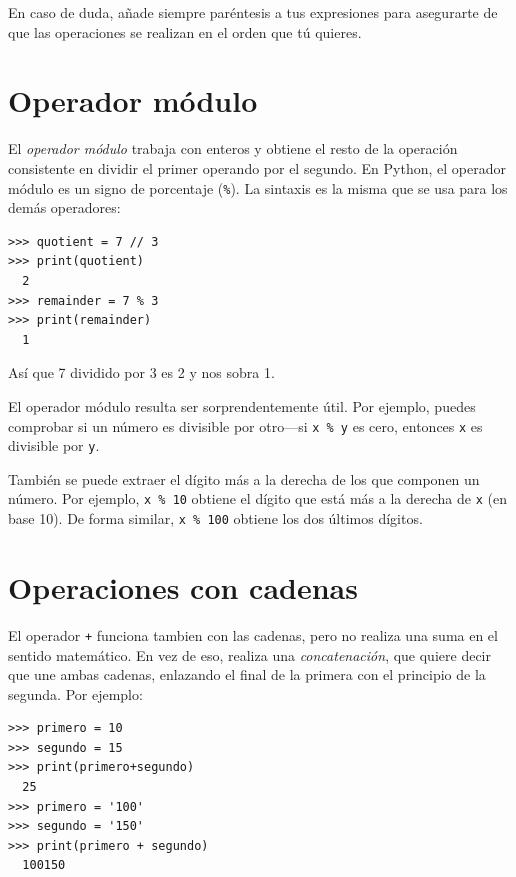 En caso de duda, añade siempre paréntesis a tus expresiones para
asegurarte de que las operaciones se realizan en el orden que tú
quieres.

\hypertarget{operador-muxf3dulo}{%
\section{Operador módulo}\label{operador-muxf3dulo}}

 

El \emph{operador módulo} trabaja con enteros y obtiene el resto de la
operación consistente en dividir el primer operando por el segundo. En
Python, el operador módulo es un signo de porcentaje (\texttt{\%}). La
sintaxis es la misma que se usa para los demás operadores:

\begin{Verbatim}[frame=single]
>>> quotient = 7 // 3
>>> print(quotient)
  2
>>> remainder = 7 % 3
>>> print(remainder)
  1
\end{Verbatim}


Así que 7 dividido por 3 es 2 y nos sobra 1.

El operador módulo resulta ser sorprendentemente útil. Por ejemplo,
puedes comprobar si un número es divisible por otro---si
\texttt{x\ \%\ y} es cero, entonces \texttt{x} es divisible por
\texttt{y}.


También se puede extraer el dígito más a la derecha de los que componen
un número. Por ejemplo, \texttt{x\ \%\ 10} obtiene el dígito que está
más a la derecha de \texttt{x} (en base 10). De forma similar,
\texttt{x\ \%\ 100} obtiene los dos últimos dígitos.

\hypertarget{operaciones-con-cadenas}{%
\section{Operaciones con cadenas}\label{operaciones-con-cadenas}}
 

El operador \texttt{+} funciona tambien con las cadenas, pero no realiza una
suma en el sentido matemático. En vez de eso, realiza una
\emph{concatenación}, que quiere decir que une ambas cadenas, enlazando
el final de la primera con el principio de la segunda. Por ejemplo:

\begin{Verbatim}[frame=single]
>>> primero = 10
>>> segundo = 15
>>> print(primero+segundo)
  25
>>> primero = '100'
>>> segundo = '150'
>>> print(primero + segundo)
  100150
\end{Verbatim}

